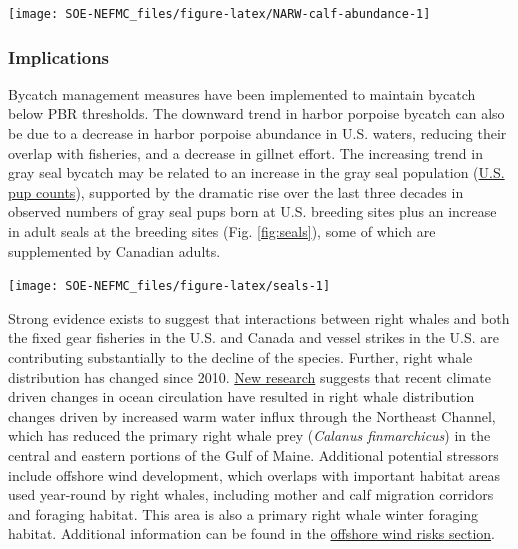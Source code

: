 \documentclass[
  10pt,
]{article}
\let\origfigure\figure
\let\endorigfigure\endfigure
\renewenvironment{figure}[1][2] {
    \expandafter\origfigure\expandafter[H]
} {
    \endorigfigure
}
\begin{document}
\begin{figure}

{\centering \texttt{[image: SOE-NEFMC\_files/figure-latex/NARW-calf-abundance-1]} 

}

\caption{Number of North Atlantic right whale calf births, 1990 - 2021.}\label{fig:NARW-calf-abundance}
\end{figure}

\hypertarget{implications-5}{%
\subsubsection{Implications}\label{implications-5}}

Bycatch management measures have been implemented to maintain bycatch below PBR thresholds. The downward trend in harbor porpoise bycatch can also be due to a decrease in harbor porpoise abundance in U.S. waters, reducing their overlap with fisheries, and a decrease in gillnet effort. The increasing trend in gray seal bycatch may be related to an increase in the gray seal population (\href{https://noaa-edab.github.io/catalog/seal_pups.html}{U.S. pup counts}), supported by the dramatic rise over the last three decades in observed numbers of gray seal pups born at U.S. breeding sites plus an increase in adult seals at the breeding sites (Fig. \ref{fig:seals}), some of which are supplemented by Canadian adults.

\begin{figure}

{\centering \texttt{[image: SOE-NEFMC\_files/figure-latex/seals-1]} 

}

\caption{Estimated number of gray seal pups born at four United States pupping colonies at various times from 1988 to 2021. Recreated from Wood et al. 2022 (Figure 5).}\label{fig:seals}
\end{figure}

Strong evidence exists to suggest that interactions between right whales and both the fixed gear fisheries in the U.S. and Canada and vessel strikes in the U.S. are contributing substantially to the decline of the species. Further, right whale distribution has changed since 2010. \href{https://noaa-edab.github.io/catalog/narw.html}{New research} suggests that recent climate driven changes in ocean circulation have resulted in right whale distribution changes driven by increased warm water influx through the Northeast Channel, which has reduced the primary right whale prey (\emph{Calanus finmarchicus}) in the central and eastern portions of the Gulf of Maine. Additional potential stressors include offshore wind development, which overlaps with important habitat areas used year-round by right whales, including mother and calf migration corridors and foraging habitat. This area is also a primary right whale winter foraging habitat. Additional information can be found in the \protect\hyperlink{wind-risks}{offshore wind risks section}.
\end{document}

